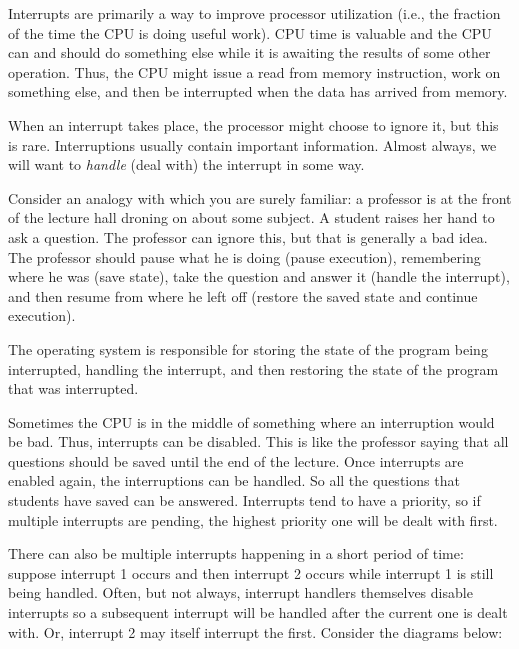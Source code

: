 Interrupts are primarily a way to improve processor utilization (i.e., the fraction of the time the CPU is doing useful work). CPU time is valuable and the CPU can and should do something else while it is awaiting the results of some other operation. Thus, the CPU might issue a read from memory instruction, work on something else, and then be interrupted when the data has arrived from memory.

When an interrupt takes place, the processor might choose to ignore it, but this is rare. Interruptions usually contain important information. Almost always, we will want to \textit{handle} (deal with) the interrupt in some way.

Consider an analogy with which you are surely familiar: a professor is at the front of the lecture hall droning on about some subject. A student raises her hand to ask a question. The professor can ignore this, but that is generally a bad idea. The professor should pause what he is doing (pause execution), remembering where he was (save state), take the question and answer it (handle the interrupt), and then resume from where he left off (restore the saved state and continue execution).

The operating system is responsible for storing the state of the program being interrupted, handling the interrupt, and then restoring the state of the program that was interrupted.

Sometimes the CPU is in the middle of something where an interruption would be bad. Thus, interrupts can be disabled. This is like the professor saying that all questions should be saved until the end of the lecture. Once interrupts are enabled again, the interruptions can be handled. So all the questions that students have saved can be answered. Interrupts tend to have a priority, so if multiple interrupts are pending, the highest priority one will be dealt with first.

There can also be multiple interrupts happening in a short period of time: suppose interrupt 1 occurs and then interrupt 2 occurs while interrupt 1 is still being handled. Often, but not always, interrupt handlers themselves disable interrupts so a subsequent interrupt will be handled after the current one is dealt with. Or, interrupt 2 may itself interrupt the first. Consider the diagrams below:

